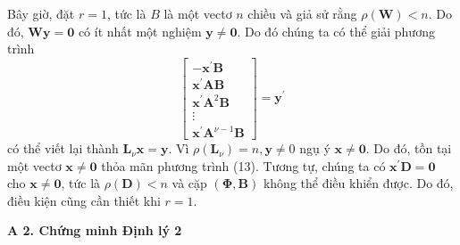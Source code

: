 \documentclass[12pt,a4paper]{article}
\begin{document}
Bây giờ, đặt $r=1$, tức là $B$ là một vectơ $n$ chiều và giả sử rằng $\rho(\boldsymbol{W})<n$. Do đó, $\mathbf{W} \boldsymbol{y}=\mathbf{0}$ có ít nhất một nghiệm $\mathbf{y} \neq \mathbf{0}$. Do đó chúng ta có thể giải phương trình
$$
\left[\begin{array}{c}
	-\mathbf{x}^{\prime} \mathbf{B} \\
	\mathbf{x}^{\prime} \mathbf{A B} \\
	\mathbf{x}^{\prime} \mathbf{A}^2 \mathbf{B} \\
	\vdots \\
	\mathbf{x}^{\prime} \mathbf{A}^{\nu-1} \mathbf{B}
\end{array}\right]=\mathbf{y}^{\prime}
$$
có thể viết lại thành $\mathbf{L}_\nu \mathbf{x}=\mathbf{y}$. Vì $\rho\left(\mathbf{L}_\nu\right)=n, \mathbf{y} \neq 0$ ngụ ý $\mathbf{x} \neq \mathbf{0}$. Do đó, tồn tại một vectơ $\mathbf{x} \neq \mathbf{0}$ thỏa mãn phương trình (13). Tương tự, chúng ta có $\mathbf{x}^{\prime} \mathbf{D}=\mathbf{0}$ cho $\mathbf{x} \neq \mathbf{0}$, tức là $\rho(\mathbf {D})<n$ và cặp $(\boldsymbol{\Phi}, \mathbf{B})$ không thể điều khiển được. Do đó, điều kiện cũng cần thiết khi $r=1$.

\textbf{A 2. Chứng minh Định lý 2}
\end{document}
